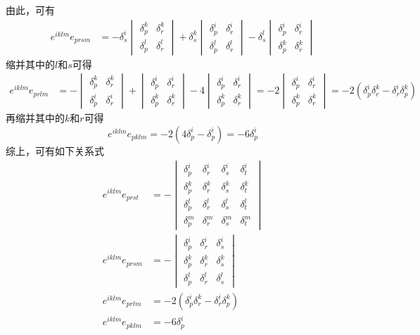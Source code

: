 由此，可有
\begin{align*}
	e^{iklm}e_{prsm} & = -\delta^i_s \begin{vmatrix} \delta^k_p & \delta^k_r \\ \delta^l_p & \delta^l_r \end{vmatrix} + \delta^k_s \begin{vmatrix} \delta^i_p & \delta^i_r \\ \delta^l_p & \delta^l_r \end{vmatrix} - \delta^l_s \begin{vmatrix} \delta^i_p & \delta^i_r \\ \delta^k_p & \delta^k_r \end{vmatrix}
\end{align*}
缩并其中的$l$和$s$可得
\begin{align*}
	e^{iklm}e_{prlm} & = -\begin{vmatrix} \delta^k_p & \delta^k_r \\ \delta^i_p & \delta^i_r \end{vmatrix} + \begin{vmatrix} \delta^i_p & \delta^i_r \\ \delta^k_p & \delta^k_r \end{vmatrix} - 4 \begin{vmatrix} \delta^i_p & \delta^i_r \\ \delta^k_p & \delta^k_r \end{vmatrix} = -2 \begin{vmatrix} \delta^i_p & \delta^i_r \\ \delta^k_p & \delta^k_r \end{vmatrix} = -2(\delta^i_p\delta^k_r - \delta^i_r\delta^k_p)
\end{align*}
再缩并其中的$k$和$r$可得
\begin{equation*}
	e^{iklm}e_{pklm} = -2(4\delta^i_p - \delta^i_p) = -6\delta^i_p
\end{equation*}
综上，可有如下关系式
\begin{align}
	e^{iklm}e_{prst} & = -\begin{vmatrix} \delta^i_p & \delta^i_r & \delta^i_s & \delta^i_t \\ \delta^k_p & \delta^k_r & \delta^k_s & \delta^k_t \\ \delta^l_p & \delta^l_r & \delta^l_s & \delta^l_t \\ \delta^m_p & \delta^m_r & \delta^m_s & \delta^m_t \end{vmatrix} \\
	e^{iklm}e_{prsm} & = -\begin{vmatrix} \delta^i_p & \delta^i_r & \delta^i_s \\ \delta^k_p & \delta^k_r & \delta^k_s \\ \delta^l_p & \delta^l_r & \delta^l_s \end{vmatrix} \\
	e^{iklm}e_{prlm} & = -2(\delta^i_p\delta^k_r - \delta^i_r\delta^k_p) \\
	e^{iklm}e_{pklm} & = -6\delta^i_p
\end{align}

